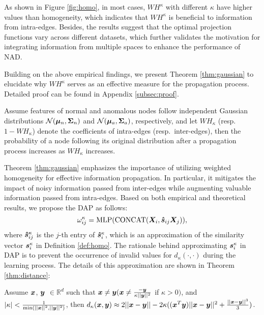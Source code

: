 As shown in Figure \ref{fig:homo}, in most cases, $WH^\kappa$ with different $\kappa$ have higher values than homogeneity, which indicates that $WH^\kappa$ is beneficial to information from intra-edges. Besides, the results suggest that the optimal projection functions vary across different datasets, which further validates the motivation for integrating information from multiple spaces to enhance the performance of NAD. 

Building on the above empirical findings, we present Theorem \ref{thm:gaussian} to elucidate why $WH^\kappa$ serves as an effective measure for the propagation process. Detailed proof can be found in Appendix \ref{subsec:proof}. 
\begin{theorem}
\label{thm:gaussian}
    Assume features of normal and anomalous nodes follow independent Gaussian distributions $\mathcal{N}(\boldsymbol{\mu}_n, \boldsymbol{\Sigma}_n)$ and $\mathcal{N}(\boldsymbol{\mu}_a, \boldsymbol{\Sigma}_a)$, respectively, and let $WH_\kappa$ (resp.\ $1-WH_\kappa$) denote the coefficients of intra-edges (resp.\ inter-edges), then the probability of a node following its original distribution after a propagation process increases as $WH_\kappa$ increases. 
\end{theorem}

Theorem \ref{thm:gaussian} emphasizes the importance of utilizing weighted homogeneity for effective information propagation. In particular, it mitigates the impact of noisy information passed from inter-edges while augmenting valuable information passed from intra-edges. Based on both empirical and theoretical results, we propose the DAP as follows: 
\begin{equation}\label{eqn:weighthomo}
    \omega_{ij}^\kappa=\text{MLP}(\text{CONCAT}(\boldsymbol{X}_i, \boldsymbol{\hat{s}}_{ij}\boldsymbol{X}_j)), 
\end{equation}
where $\boldsymbol{\hat{s}}_{ij}^\kappa$ is the $j$-th entry of $\boldsymbol{\hat{s}}_{i}^\kappa$, which is an approximation of the similarity vector $\boldsymbol{s}_{i}^\kappa$ in Definition \ref{def:homo}. The rationale behind approximating $\boldsymbol{s}_{i}^\kappa$ in DAP is to prevent the occurrence of invalid values for $d_\kappa(\cdot, \cdot)$ during the learning process. The details of this approximation are shown in Theorem \ref{thm:distance}: 

\begin{theorem}
\label{thm:distance}
    Assume $\boldsymbol{x}$, $\boldsymbol{y}$ $\in \mathbb{R}^d$ such that $\boldsymbol{x}\neq \boldsymbol{y} (\boldsymbol{x}\neq \frac{-\boldsymbol{y}}{\kappa||\boldsymbol{y}||^2}$ if $\kappa > 0)$, and $|\kappa|<\frac{1}{\min(||\boldsymbol{x}||^2, ||\boldsymbol{y}||^2)}$, then $d_\kappa(\boldsymbol{x}, \boldsymbol{y})\approx 2||\boldsymbol{x}-\boldsymbol{y}||-2\kappa((\boldsymbol{x}^T\boldsymbol{y})||\boldsymbol{x}-\boldsymbol{y}||^2+\frac{||\boldsymbol{x}-\boldsymbol{y}||^3}{3})$. 
\end{theorem}

